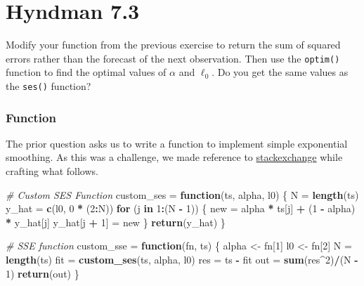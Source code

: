\documentclass[openany]{book}
\newenvironment{Shaded}{\begin{snugshade}}{\end{snugshade}}
\newcommand{\CommentTok}[1]{\textcolor[rgb]{0.56,0.35,0.01}{\textit{#1}}}
\newcommand{\ControlFlowTok}[1]{\textcolor[rgb]{0.13,0.29,0.53}{\textbf{#1}}}
\newcommand{\DecValTok}[1]{\textcolor[rgb]{0.00,0.00,0.81}{#1}}
\newcommand{\KeywordTok}[1]{\textcolor[rgb]{0.13,0.29,0.53}{\textbf{#1}}}
\newcommand{\NormalTok}[1]{#1}
\newcommand{\OperatorTok}[1]{\textcolor[rgb]{0.81,0.36,0.00}{\textbf{#1}}}
\newcommand{\StringTok}[1]{\textcolor[rgb]{0.31,0.60,0.02}{#1}}
\renewenvironment{quote}{\begin{myquote}}{\end{myquote}}
\begin{document}
\hypertarget{hyndman-7.3}{%
\section{Hyndman 7.3}\label{hyndman-7.3}}

\begin{quote}
Modify your function from the previous exercise to return the sum of squared errors rather than the forecast of the next observation. Then use the \texttt{optim()} function to find the optimal values of \(\alpha\) and \(\ell_0\). Do you get the same values as the \texttt{ses()} function?
\end{quote}

\hypertarget{function}{%
\subsubsection{Function}\label{function}}

The prior question asks us to write a function to implement simple exponential smoothing. As this was a challenge, we made reference to \href{https://stats.stackexchange.com/questions/379727/how-to-use-optim-function-in-r-on-my-custom-residual-sum-of-squares-function}{stackexchange} while crafting what follows.

\begin{Shaded}
\begin{Highlighting}[]
\CommentTok{# Custom SES Function}
\NormalTok{custom_ses =}\StringTok{ }\ControlFlowTok{function}\NormalTok{(ts, alpha, l0) \{}
\NormalTok{  N =}\StringTok{ }\KeywordTok{length}\NormalTok{(ts)}
\NormalTok{  y_hat =}\StringTok{ }\KeywordTok{c}\NormalTok{(l0, }\DecValTok{0} \OperatorTok{*}\StringTok{ }\NormalTok{(}\DecValTok{2}\OperatorTok{:}\NormalTok{N))}
  \ControlFlowTok{for}\NormalTok{ (j }\ControlFlowTok{in} \DecValTok{1}\OperatorTok{:}\NormalTok{(N }\OperatorTok{-}\StringTok{ }\DecValTok{1}\NormalTok{)) \{}
\NormalTok{    new =}\StringTok{ }\NormalTok{alpha }\OperatorTok{*}\StringTok{ }\NormalTok{ts[j] }\OperatorTok{+}\StringTok{ }\NormalTok{(}\DecValTok{1} \OperatorTok{-}\StringTok{ }\NormalTok{alpha) }\OperatorTok{*}\StringTok{ }\NormalTok{y_hat[j]}
\NormalTok{    y_hat[j }\OperatorTok{+}\StringTok{ }\DecValTok{1}\NormalTok{] =}\StringTok{ }\NormalTok{new}
\NormalTok{  \}}
  \KeywordTok{return}\NormalTok{(y_hat)}
\NormalTok{\}}

\CommentTok{# SSE function}
\NormalTok{custom_sse =}\StringTok{ }\ControlFlowTok{function}\NormalTok{(fn, ts) \{}
\NormalTok{  alpha <-}\StringTok{ }\NormalTok{fn[}\DecValTok{1}\NormalTok{]}
\NormalTok{  l0 <-}\StringTok{ }\NormalTok{fn[}\DecValTok{2}\NormalTok{]}
\NormalTok{  N =}\StringTok{ }\KeywordTok{length}\NormalTok{(ts)}
\NormalTok{  fit =}\StringTok{ }\KeywordTok{custom_ses}\NormalTok{(ts, alpha, l0)}
\NormalTok{  res =}\StringTok{ }\NormalTok{ts }\OperatorTok{-}\StringTok{ }\NormalTok{fit}
\NormalTok{  out =}\StringTok{ }\KeywordTok{sum}\NormalTok{(res}\OperatorTok{^}\DecValTok{2}\NormalTok{)}\OperatorTok{/}\NormalTok{(N }\OperatorTok{-}\StringTok{ }\DecValTok{1}\NormalTok{)}
  \KeywordTok{return}\NormalTok{(out)}
\NormalTok{\}}
\end{Highlighting}
\end{Shaded}
\end{document}
